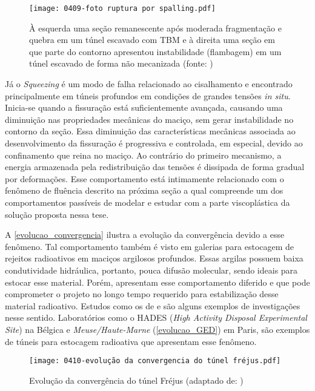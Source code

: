 \begin{figure}[H]
	\begin{center}
		\texttt{[image: 0409-foto ruptura por spalling.pdf]}
	\end{center}
	\caption{\label{foto_spalling}À esquerda uma seção remanescente após moderada fragmentação e quebra em um túnel escavado com TBM e à direita uma seção em que parte do contorno apresentou instabilidade (flambagem) em um túnel escavado de forma não mecanizada (fonte: )}
\end{figure}

Já o \textit{Squeezing} é um modo de falha relacionado ao cisalhamento e encontrado principalmente em túneis profundos em condições de grandes tensões \textit{in situ}. Inicia-se quando a fissuração está suficientemente avançada, causando uma diminuição nas propriedades mecânicas do maciço, sem gerar instabilidade no contorno da seção. Essa diminuição das características mecânicas associada ao desenvolvimento da fissuração é progressiva e controlada, em especial, devido ao confinamento que reina no maciço. Ao contrário do primeiro mecanismo, a energia armazenada pela redistribuição das tensões é dissipada de forma gradual por deformações. Esse comportamento está intimamente relacionado com o fenômeno de fluência descrito na próxima seção a qual compreende um dos comportamentos passíveis de modelar e estudar com a parte viscoplástica da solução proposta nessa tese.

A \autoref{evolucao_convergencia} ilustra a evolução da convergência devido a esse fenômeno. Tal comportamento também é visto em galerias para estocagem de rejeitos radioativos em maciços argilosos profundos. Essas argilas possuem baixa condutividade hidráulica, portanto, pouca difusão molecular, sendo ideais para estocar esse material. Porém, apresentam esse comportamento diferido e que pode comprometer o projeto no longo tempo requerido para estabilização desse material radioativo. Estudos como os de  e  são alguns exemplos de investigações nesse sentido. Laboratórios como o HADES (\textit{High Activity Disposal Experimental Site}) na Bélgica e \textit{Meuse/Haute-Marne} (\autoref{evolucao_GED}) em Paris, são exemplos de túneis para estocagem radioativa que apresentam esse fenômeno.

\begin{figure}[H]
	\begin{center}
		\texttt{[image: 0410-evolução da convergencia do túnel fréjus.pdf]}
	\end{center}
	\caption{\label{evolucao_convergencia}Evolução da convergência do túnel Fréjus (adaptado de: )}
\end{figure}

